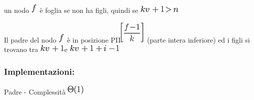 \documentclass{article}
\begin{document}
{}

{un nodo }\includegraphics{images/image112.png}{~è foglia se non ha
figli, quindi se }\includegraphics{images/image113.png}

{}

{Il padre del nodo }\includegraphics{images/image112.png}{~è in
posizione }{PII}\includegraphics{images/image114.png}{~(parte intera
inferiore) }{ed i figli si trovano tra
}\includegraphics{images/image115.png}{e
}\includegraphics{images/image116.png}

{}

\hypertarget{h.6c4aui6rl05k}{\subsubsection{\texorpdfstring{{Implementazioni:}}{Implementazioni:}}\label{h.6c4aui6rl05k}}

{}

{Padre - }{Complessità}\includegraphics{images/image107.png}

\protect\hypertarget{t.985fc1f36a4403829b157356928a51ed5f0644e7}{}{}\protect\hypertarget{t.7}{}{}
\end{document}
